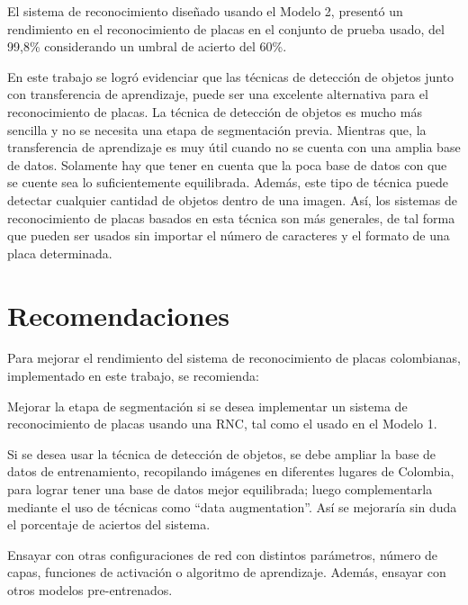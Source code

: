 El sistema de reconocimiento diseñado usando el Modelo 2, presentó un rendimiento en el reconocimiento de placas en el conjunto de prueba usado, del 99,8\% considerando un umbral de acierto del 60\%.  

En este trabajo se logró evidenciar que las técnicas de detección de objetos junto con transferencia de aprendizaje, puede ser una excelente alternativa para el reconocimiento de placas. La técnica de detección de objetos es mucho más sencilla y no se necesita una etapa de segmentación previa. Mientras que, la transferencia de aprendizaje es muy útil cuando no se cuenta con una amplia base de datos. Solamente hay que tener en cuenta que la poca base de datos con que se cuente sea lo suficientemente equilibrada. Además, este tipo de técnica puede detectar cualquier cantidad de objetos dentro de una imagen. Así, los sistemas de reconocimiento de placas basados en esta técnica son más generales, de tal forma que pueden ser usados sin importar el número de caracteres y el formato de una placa determinada.

\section*{Recomendaciones}


Para mejorar el rendimiento del sistema de reconocimiento de placas colombianas, implementado en este trabajo, se recomienda:

Mejorar la etapa de segmentación si se desea implementar un sistema de reconocimiento de placas usando una RNC, tal como el usado en el Modelo 1.

Si se desea usar la técnica de detección de objetos, se debe ampliar la base de datos de entrenamiento,  recopilando imágenes en diferentes lugares de Colombia, para lograr tener una base de datos mejor equilibrada; luego complementarla mediante el uso de técnicas como “data augmentation”. Así se mejoraría sin duda el porcentaje de aciertos del sistema.

Ensayar con otras configuraciones de red con distintos parámetros, número de capas, funciones de activación o algoritmo de aprendizaje. Además, ensayar con otros modelos pre-entrenados.
    
